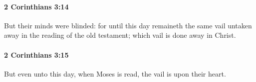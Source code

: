 		\paragraph{2 Corinthians 3:14} %
			\label{2CORINTHIANS-3-14}

			But their minds were blinded: for until this day remaineth the same vail untaken away in the reading of the old testament; which vail is done away in Christ.

			\begin{framed}
			\scriptsize
				\begin{compactdesc}
					\item[SBLG] 
				\end{compactdesc}
			\end{framed}

		\paragraph{2 Corinthians 3:15} %
			\label{2CORINTHIANS-3-15}

			But even unto this day, when Moses is read, the vail is upon their heart.

